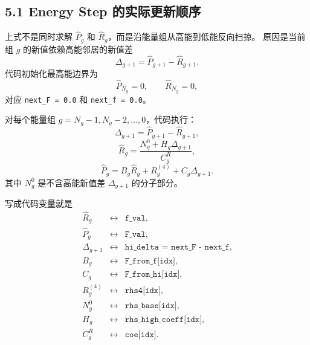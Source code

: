 \documentclass[11pt,a4paper]{ctexart}
\begin{document}
\subsection*{5.1 Energy Step 的实际更新顺序}

上式不是同时求解 \(\widehat P_g\) 和 \(\widehat R_g\)，而是沿能量组从高能到低能反向扫掠。
原因是当前组 \(g\) 的新值依赖高能邻居的新值差
\begin{equation}
  \Delta_{g+1}
  =
  \widehat P_{g+1}-\widehat R_{g+1}.
\end{equation}
代码初始化最高能边界为
\begin{equation}
  \widehat P_{N_g}=0,
  \qquad
  \widehat R_{N_g}=0,
\end{equation}
对应 \texttt{next\_F = 0.0} 和 \texttt{next\_f = 0.0}。

对每个能量组 \(g=N_g-1,N_g-2,\ldots,0\)，代码执行：
\begin{equation}
  \Delta_{g+1}
  =
  \widehat P_{g+1}-\widehat R_{g+1},
\end{equation}
\begin{equation}
  \widehat R_g
  =
  \frac{
    N_g^{0}+H_g\Delta_{g+1}
  }{
    C_g^R
  },
\end{equation}
\begin{equation}
  \widehat P_g
  =
  B_g\widehat R_g
  +
  R_g^{(4)}
  +
  C_g\Delta_{g+1}.
\end{equation}
其中 \(N_g^0\) 是不含高能新值差 \(\Delta_{g+1}\) 的分子部分。

写成代码变量就是
\begin{equation}
\begin{array}{lll}
\widehat R_g &\leftrightarrow& \texttt{f\_val},\\
\widehat P_g &\leftrightarrow& \texttt{F\_val},\\
\Delta_{g+1} &\leftrightarrow& \texttt{hi\_delta = next\_F - next\_f},\\
B_g &\leftrightarrow& \texttt{F\_from\_f[idx]},\\
C_g &\leftrightarrow& \texttt{F\_from\_hi[idx]},\\
R_g^{(4)} &\leftrightarrow& \texttt{rhs4[idx]},\\
N_g^0 &\leftrightarrow& \texttt{rhs\_base[idx]},\\
H_g &\leftrightarrow& \texttt{rhs\_high\_coeff[idx]},\\
C_g^R &\leftrightarrow& \texttt{coe[idx]}.
\end{array}
\end{equation}
\end{document}
